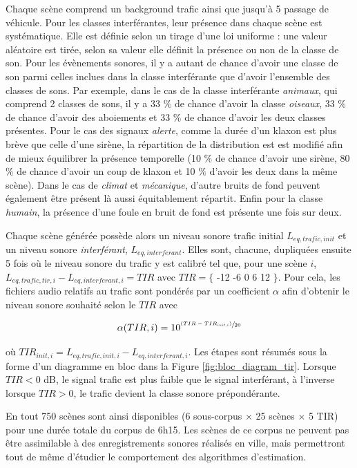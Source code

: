 Chaque scène comprend un background trafic ainsi que jusqu'à 5 passage de véhicule.
Pour les classes interférantes, leur présence dans chaque scène est systématique. Elle est définie selon un tirage d'une loi uniforme : une valeur aléatoire est tirée, selon sa valeur elle définit la présence ou non de la classe de son. Pour les évènements sonores, il y a autant de chance d'avoir une classe de son parmi celles inclues dans la classe interférante que d'avoir l'ensemble des classes de sons. Par exemple, dans le cas de la classe interférante \textit{animaux}, qui comprend 2 classes de sons, il y a 33 $\%$ de chance d'avoir la classe \textit{oiseaux}, 33 $\%$ de chance d'avoir des aboiements et 33 $\%$ de chance d'avoir les deux classes présentes. Pour le cas des signaux \textit{alerte}, comme la durée d'un klaxon est plus brève que celle d'une sirène, la répartition de la distribution est est modifié afin de mieux équilibrer la présence temporelle (10 $\%$ de chance d'avoir une sirène, 80 $\%$ de chance d'avoir un coup de klaxon et 10 $\%$ d'avoir les deux dans la même scène).
Dans le cas de \textit{climat} et \textit{mécanique}, d'autre bruits de fond peuvent également être présent là aussi équitablement répartit. Enfin pour la classe \textit{humain}, la présence d'une foule en bruit de fond est présente une fois sur deux.


Chaque scène générée possède alors un niveau sonore trafic initial $L_{eq,trafic,init}$ et un niveau sonore \textit{interférant}, $L_{eq,interferant}$. Elles sont, chacune, dupliquées ensuite 5 fois où le niveau sonore du trafic y est calibré tel que, pour une scène $i$, $L_{eq,trafic, tir, i} - L_{eq,interferant, i} = TIR$ avec $TIR = \lbrace$ -12 -6 0 6 12 $\rbrace$. Pour cela, les fichiers audio relatifs au trafic sont pondérés par un coefficient $\alpha$ afin d'obtenir le niveau sonore souhaité selon le $TIR$ avec

\begin{equation}
\alpha(TIR,i) = 10^{\sfrac{(TIR-TIR_{init,i})}{20}}
\end{equation}

où $TIR_{init,i} = L_{eq,trafic,init,i}-L_{eq,interferant,i}$. Les étapes sont résumés sous la forme d'un diagramme en bloc dans la Figure \ref{fig:bloc_diagram_tir}. Lorsque $TIR < 0$ dB, le signal trafic est plus faible que le signal interférant, à l'inverse lorsque $TIR>0$, le trafic devient la classe sonore prépondérante. 



En tout 750 scènes sont ainsi disponibles (6 sous-corpus $\times$ 25 scènes $\times$ 5 TIR) pour une durée totale du corpus de 6h15. Les scènes de ce corpus ne peuvent pas être assimilable à des enregistrements sonores réalisés en ville, mais permettront tout de même d'étudier le comportement des algorithmes d'estimation. 

